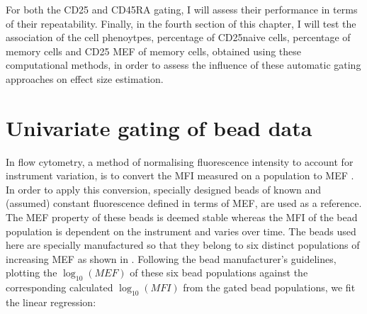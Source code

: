 For both the CD25 and CD45RA gating, I will assess their performance in terms of their repeatability.
Finally, in the fourth section of this chapter, I will test the association of the cell phenoytpes, percentage of CD25\positive naive cells, percentage of memory cells and CD25 MEF of memory cells, obtained using these computational methods, in order to assess the influence of these automatic gating approaches on effect size estimation.






\section{Univariate gating of bead data}

In flow cytometry, a method of normalising fluorescence intensity to account for instrument variation, is to convert the \gls{MFI}
measured on a population to \gls{MEF} \citep{Schwartz:1996jj,Dendrou:2009bl}.
In order to apply this conversion, specially designed beads of known and (assumed) constant fluorescence defined in terms of \gls{MEF}, are used as a reference.
The MEF property of these beads is deemed stable whereas the MFI of the bead population is dependent on the instrument and varies over time.
The beads used here are specially manufactured so that they belong to six distinct populations of increasing MEF as shown in .
Following the bead manufacturer's guidelines, plotting the $\log_{10}(MEF)$ of these six bead populations against the corresponding calculated $\log_{10}(MFI)$ from the gated bead populations, we fit the linear regression:

